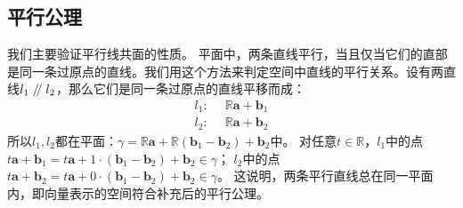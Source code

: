 \documentclass[12pt,UTF8]{ctexbook}
\renewcommand\parallel{\mathrel{/\mskip-4mu/}}
\begin{document}
\begin{appendix}
\section{平行公理}
我们主要验证平行线共面的性质。
平面中，两条直线平行，当且仅当它们的直部是同一条过原点的直线。我们用这个方法来判定空间中直线的平行关系。设有两直线$l_1\parallel l_2$，那么它们是同一条过原点的直线平移而成：
\begin{align*}
l_1: & \,\,\, \mathbb{R}\mathbf{a} + \mathbf{b}_1  \\
l_2: & \,\,\, \mathbb{R}\mathbf{a} + \mathbf{b}_2
\end{align*}
所以$l_1,l_2$都在平面：$\gamma = \mathbb{R}\mathbf{a} + \mathbb{R}(\mathbf{b}_1 - \mathbf{b}_2) + \mathbf{b}_2$中。
对任意$t\in\mathbb{R}$，$l_1$中的点$t\mathbf{a} + \mathbf{b}_1 = t\mathbf{a} + 1\cdot(\mathbf{b}_1 - \mathbf{b}_2) + \mathbf{b}_2 \in \gamma$；
$l_2$中的点$t\mathbf{a} + \mathbf{b}_2 = t\mathbf{a} + 0\cdot(\mathbf{b}_1 - \mathbf{b}_2) + \mathbf{b}_2 \in \gamma$。
这说明，两条平行直线总在同一平面内，即向量表示的空间符合补充后的平行公理。

\end{appendix}






\end{document}
